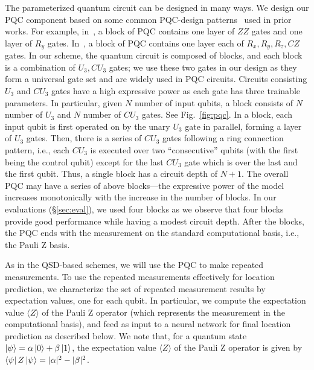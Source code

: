 The parameterized quantum circuit can be designed in many ways. 
We design our PQC component based on some common PQC-design patterns~\cite{liang2023unleashing, ICCAD21-wang} used in prior works.
For example, in~\cite{lloyd2020quantum}, a block of 
PQC contains one layer of $ZZ$ gates 
and one layer of $R_y$ gates.
In~\cite{McClean_2018}, a block of PQC contains one layer each
of $R_x, R_y, R_z, CZ$ gates.
In our scheme, the quantum circuit is composed of blocks, and 
each block is a combination of $U_3, CU_3$ gates;
we use these two gates in our design as they form a universal
gate set and are widely used in PQC circuits.
Circuits consisting $U_3$ and $CU_3$ gates have a high expressive power as each gate has three trainable parameters.
In particular, given $N$ number of input qubits, a block consists of 
$N$ number of $U_3$ and $N$ number of $CU_3$ gates. 
See Fig.~\ref{fig:pqc}.
In a block, each input qubit is first  
operated on by the unary $U_3$ gate in parallel,
forming a layer of $U_3$ gates. 
Then, there is a series of $CU_3$ gates following a ring connection pattern, 
i.e., each $CU_3$ is executed over two ``consecutive'' qubits (with the first being
the control qubit) except for the
last $CU_3$ gate which is over the last and the first qubit. 
Thus, a single block has a circuit depth of $N+1$.
The overall PQC may have a series of above blocks---the expressive power of the model increases monotonically with the increase in the number of blocks.
In our evaluations (\S\ref{sec:eval}), we used four blocks as we observe that four blocks provide good performance while having a modest circuit depth.
After the blocks, the PQC ends with the measurement on the standard computational basis, 
i.e., the Pauli Z basis.

As in the QSD-based schemes, we will use the PQC to make repeated measurements.
To use the repeated measurements effectively for location prediction, we characterize
the set of repeated measurement results by expectation values, one for each qubit.
In particular, we compute the expectation value 
$\langle Z \rangle$ of the Pauli Z operator 
(which represents
the measurement in the computational basis), and feed as input to a neural network for 
final location prediction as described below. 
We note that, for a quantum state $\ket{\psi} = \alpha \ket{0} + \beta \ket{1}$, the expectation value 
$\langle Z \rangle$ of the Pauli Z operator is given by $\bra{\psi} Z \ket{\psi} = |\alpha|^{2} - |\beta|^{2}$.



